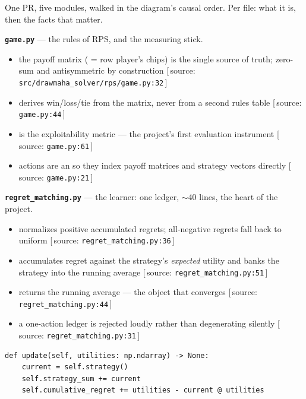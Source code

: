 \documentclass[11pt]{article}
\newcommand{\source}[1]{{\small\textcolor{softgray}{[\,source: \texttt{#1}\,]}}}
\begin{document}
\noindent One PR, five modules, walked in the diagram's causal order. Per
file: what it is, then the facts that matter.

\medskip
\noindent\textbf{\texttt{game.py}} --- the rules of RPS, and the measuring stick.
\begin{itemize}[leftmargin=*, nosep]
  \item the payoff matrix ( = row player's chips) is the
        single source of truth; zero-sum and antisymmetric by construction
        \source{src/drawmaha\_solver/rps/game.py:32}
  \item {} derives win/loss/tie from the matrix, never from a
        second rules table \source{game.py:44}
  \item {} is the exploitability metric ---
        the project's first evaluation instrument \source{game.py:61}
  \item actions are an  so they index payoff matrices and
        strategy vectors directly \source{game.py:21}
\end{itemize}

\medskip
\noindent\textbf{\texttt{regret\_matching.py}} --- the learner: one ledger,
$\sim$40 lines, the heart of the project.
\begin{itemize}[leftmargin=*, nosep]
  \item {} normalizes positive accumulated regrets;
        all-negative regrets fall back to uniform
        \source{regret\_matching.py:36}
  \item {} accumulates regret against the strategy's
        \emph{expected} utility and banks the strategy into the running
        average \source{regret\_matching.py:51}
  \item {} returns the running average --- the object
        that converges \source{regret\_matching.py:44}
  \item a one-action ledger is rejected loudly rather than degenerating
        silently \source{regret\_matching.py:31}
\end{itemize}

\begin{codebox}
\begin{Verbatim}[fontsize=\small, breaklines, breakanywhere]
def update(self, utilities: np.ndarray) -> None:
    current = self.strategy()
    self.strategy_sum += current
    self.cumulative_regret += utilities - current @ utilities
\end{Verbatim}
\end{codebox}
\end{document}

